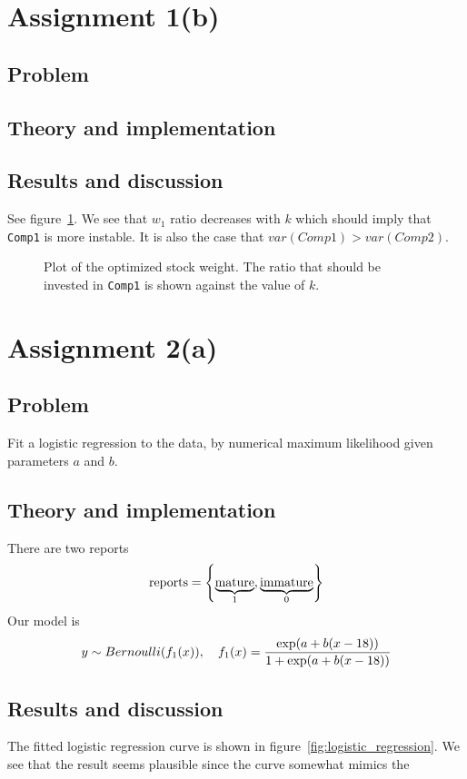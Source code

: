 \documentclass[11pt, a4paper]{article}
\let\originalleft\left
\let\originalright\right
\renewcommand{\left}{\mathopen{}\mathclose\bgroup\originalleft}
\renewcommand{\right}{\aftergroup\egroup\originalright}
\begin{document}
\section{Assignment 1(b)}
\subsection{Problem}
\subsection{Theory and implementation}
\subsection{Results and discussion}
See figure~\ref{fig:stock_weights}.
We see that $w_1$ ratio decreases with $k$
which should imply that \texttt{Comp1} is more instable.
It is also the case that $var(Comp1) > var(Comp2)$.

\begin{figure}
	\centering
	
	\caption{Plot of the optimized stock weight.
	The ratio that should be invested in \texttt{Comp1} is shown against the value of $k$. \label{fig:stock_weights}}
\end{figure}

\section{Assignment 2(a)}
\subsection{Problem}
Fit a logistic regression to the data, by numerical maximum likelihood
given parameters $a$ and $b$.
\subsection{Theory and implementation}
There are two reports
$$ \text{reports} = \left\{\underbrace{\text{mature}}_1, \underbrace{\text{immature}}_0\right\} $$
Our model is
$$ y \sim Bernoulli(f_1(x)), \quad f_1(x) = \frac{\exp\left(a + b (x - 18)\right)}{1 + \exp\left(a + b (x - 18)\right)} $$
\subsection{Results and discussion}
The fitted logistic regression curve is shown in figure~\ref{fig:logistic_regression}.
We see that the result seems plausible since the curve somewhat mimics the
\end{document}
